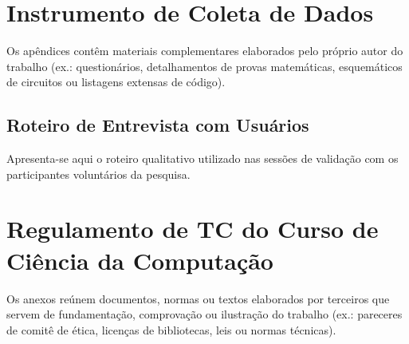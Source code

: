 \documentclass[cic,tc,biblatex]{iiufrgs}
\begin{document}

\printbibliography

\appendix

\chapter{Instrumento de Coleta de Dados}
\label{apendice:questionario}

Os apêndices contêm materiais complementares elaborados pelo próprio autor do trabalho (ex.: questionários, detalhamentos de provas matemáticas, esquemáticos de circuitos ou listagens extensas de código).

\section{Roteiro de Entrevista com Usuários}
Apresenta-se aqui o roteiro qualitativo utilizado nas sessões de validação com os participantes voluntários da pesquisa.

\annex

\chapter{Regulamento de TC do Curso de Ciência da Computação}
\label{anexo:regulamento}

Os anexos reúnem documentos, normas ou textos elaborados por terceiros que servem de fundamentação, comprovação ou ilustração do trabalho (ex.: pareceres de comitê de ética, licenças de bibliotecas, leis ou normas técnicas).
\end{document}
